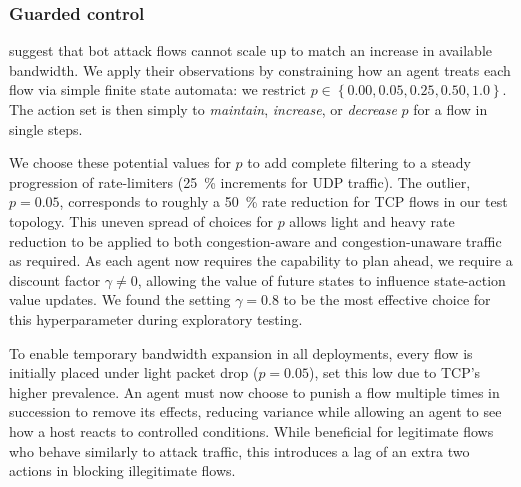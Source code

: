 \documentclass[10pt, times, conference, letterpaper]{IEEEtran}
\begin{document}
\subsubsection{Guarded control}
\Textcite{DBLP:conf/ndss/KangGS16} suggest that bot attack flows cannot scale up to match an increase in available bandwidth.
We apply their observations by constraining how an agent treats each flow via simple finite state automata: we restrict $p \in \left\{ 0.00, 0.05, 0.25, 0.50, 1.0 \right\}$.
The action set is then simply to \emph{maintain}, \emph{increase}, or \emph{decrease} $p$ for a flow in single steps.

We choose these potential values for $p$ to add complete filtering to a steady progression of rate-limiters (\SI{25}{\percent} increments for UDP traffic).
The outlier, $p=0.05$, corresponds to roughly a \SI{50}{\percent} rate reduction for TCP flows in our test topology.
This uneven spread of choices for $p$ allows light and heavy rate reduction to be applied to both congestion-aware and congestion-unaware traffic as required.
As each agent now requires the capability to plan ahead, we require a discount factor $\gamma \ne 0$, allowing the value of future states to influence state-action value updates.
We found the setting $\gamma = 0.8$ to be the most effective choice for this hyperparameter during exploratory testing.

To enable temporary bandwidth expansion in all deployments, every flow is initially placed under light packet drop ($p=0.05$), set this low due to TCP's higher prevalence.
An agent must now choose to punish a flow multiple times in succession to remove its effects, reducing variance while allowing an agent to see how a host reacts to controlled conditions.
While beneficial for legitimate flows who behave similarly to attack traffic, this introduces a lag of an extra two actions in blocking illegitimate flows.
\end{document}
